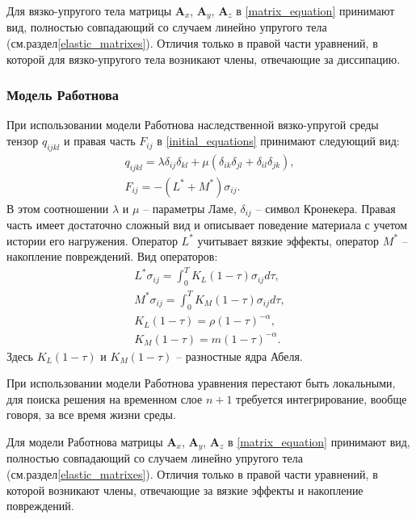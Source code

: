 Для вязко-упругого тела матрицы $\mathbf{A}_x$, $\mathbf{A}_y$, $\mathbf{A}_z$ в \ref{matrix_equation} принимают вид, полностью совпадающий со случаем линейно упругого тела (см.раздел\ref{elastic_matrixes}). Отличия только в правой части уравнений, в которой для вязко-упругого тела возникают члены, отвечающие за диссипацию.


\subsubsection{Модель Работнова}
\label{rabotnov_matrixes}

При использовании модели Работнова наследственной вязко-упругой среды тензор $q_{ijkl}$ и правая часть $F_{ij}$ в \ref{initial_equations} принимают следующий вид:
\begin{eqnarray}
\label{tensor_qijkl_rabotnov}
q_{ijkl}=\lambda\delta_{ij}\delta_{kl}+\mu(\delta_{ik}\delta_{jl}+\delta_{il}
\delta_{jk}),\nonumber\\
F_{ij}=-(L^*+M^*)\sigma_{ij}.
\end{eqnarray}
В этом соотношении $\lambda$ и $\mu$ -- параметры Ламе, $\delta_{ij}$ -- символ Кронекера. Правая часть имеет достаточно сложный вид и описывает поведение материала с учетом истории его нагружения. Оператор $L^*$ учитывает вязкие эффекты, оператор $M^*$ -- накопление повреждений. Вид операторов:
\begin{eqnarray}
\label{right_hand_rabotnov}
L^*\sigma_{ij} = \int_0^T{K_L(1-\tau)\sigma_{ij}d\tau}, \nonumber\\
M^*\sigma_{ij} = \int_0^T{K_M(1-\tau)\sigma_{ij}d\tau}, \nonumber\\
K_L(1-\tau)=\rho(1-\tau)^{-\alpha}, \nonumber\\
K_M(1-\tau)=m(1-\tau)^{-\alpha}.
\end{eqnarray}
Здесь $K_L(1-\tau)$ и $K_M(1-\tau)$ -- разностные ядра Абеля.

При использовании модели Работнова уравнения перестают быть локальными, для поиска решения на временном слое $n+1$ требуется интегрирование, вообще говоря, за все время жизни среды.

Для модели Работнова матрицы $\mathbf{A}_x$, $\mathbf{A}_y$, $\mathbf{A}_z$ в \ref{matrix_equation} принимают вид, полностью совпадающий со случаем линейно упругого тела (см.раздел\ref{elastic_matrixes}). Отличия только в правой части уравнений, в которой возникают члены, отвечающие за вязкие эффекты и накопление повреждений.

\clearpage
\newpage


